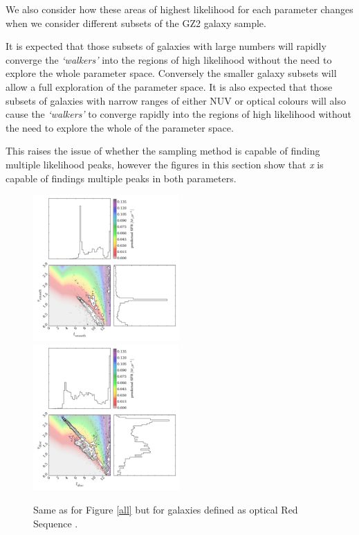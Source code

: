 \documentclass{mn2e}
\begin{document}
We also consider how these areas of highest likelihood for each parameter changes when we consider different subsets of the GZ2 galaxy sample.  

It is expected that those subsets of galaxies with large numbers will rapidly converge the \emph{`walkers'} into the regions of high likelihood without the need to explore the whole parameter space. Conversely the smaller galaxy subsets will allow a full exploration of the parameter space. It is also expected that those subsets of galaxies with narrow ranges of either NUV or optical colours will also cause the \emph{`walkers'} to converge rapidly into the regions of high likelihood without the need to explore the whole of the parameter space.


This raises the issue of whether the sampling method is capable of finding multiple likelihood peaks, however the figures in this section show that \emph{x} is capable of findings multiple peaks in both parameters. 

\begin{figure}
\includegraphics[width=0.4975\textwidth]{red_s_smooth.pdf}
\includegraphics[width=0.4975\textwidth]{red_s_disc.pdf}
\caption[8pt]{Same as for Figure \ref{all} but for galaxies defined as optical Red Sequence \cite{Baldry}.}
\label{red_s}
\end{figure}
\end{document}
